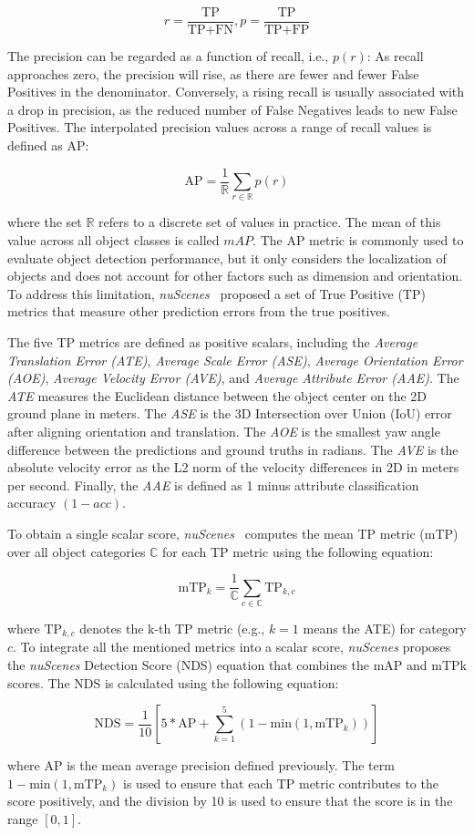 \[
    r = \frac{\text{TP}}{\text{TP}+\text{FN}}, p = \frac{\text{TP}}{\text{TP}+\text{FP}}
\]

The precision can be regarded as a function of recall, i.e., $p(r)$: As recall approaches zero, the precision will rise, as there are fewer and fewer False Positives in the denominator.
Conversely, a rising recall is usually associated with a drop in precision, as the reduced number of False Negatives leads to new False Positives.
The interpolated precision values across a range of recall values is defined as AP:

\[
    \text{AP} = \frac{1}{\mathbb{R}} \sum_{r \in \mathbb{R}} p(r)
\]

where the set $\mathbb{R}$ refers to a discrete set of values in practice.
The mean of this value across all object classes is called $mAP$.
The AP metric is commonly used to evaluate object detection performance, but it only considers the localization of objects and does not account for other factors such as dimension and orientation.
To address this limitation, \textit{nuScenes}~\cite{caesar2020nuscenes} proposed a set of True Positive (TP) metrics that measure other prediction errors from the true positives.

The five TP metrics are defined as positive scalars, including the \textit{Average Translation Error (ATE)}, \textit{Average Scale Error (ASE)}, \textit{Average Orientation Error (AOE)}, \textit{Average Velocity Error (AVE)}, and \textit{Average Attribute Error (AAE)}.
The \textit{ATE} measures the Euclidean distance between the object center on the 2D ground plane in meters.
The \textit{ASE} is the 3D Intersection over Union (IoU) error after aligning orientation and translation.
The \textit{AOE} is the smallest yaw angle difference between the predictions and ground truths in radians.
The \textit{AVE} is the absolute velocity error as the L2 norm of the velocity differences in 2D in meters per second.
Finally, the \textit{AAE} is defined as 1 minus attribute classification accuracy $(1-acc)$.

To obtain a single scalar score, \textit{nuScenes}~\cite{caesar2020nuscenes} computes the mean TP metric (mTP) over all object categories $\mathbb{C}$ for each TP metric using the following equation:

\[
    \text{mTP}_k = \frac{1}{\mathbb{C}} \sum_{c \in \mathbb{C}} \text{TP}_{k,c}
\]

where $\text{TP}_{k,c}$ denotes the k-th TP metric (e.g., $k=1$ means the ATE) for category $c$.
To integrate all the mentioned metrics into a scalar score, \textit{nuScenes} proposes the \textit{nuScenes} Detection Score (NDS) equation that combines the mAP and mTPk scores.
The NDS is calculated using the following equation:

\[
    \text{NDS} = \frac{1}{10} \left[5 * \text{AP} + \sum^5_{k=1}(1-\text{min}(1, \text{mTP}_k))\right]
\]

where AP is the mean average precision defined previously.
The term $1-\text{min}(1, \text{mTP}_k)$ is used to ensure that each TP metric contributes to the score positively, and the division by 10 is used to ensure that the score is in the range $[0, 1]$.

